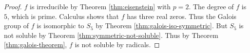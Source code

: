 \begin{proof}
    $f$ is irreducible by Theorem \ref{thm:eisenstein} with $p = 2$. The degree of $f$ is $5$, which is prime. Calculus shows that $f$ has three real zeros. Thus the Galois group of $f$ is isomorphic to $S_5$ by Theorem \ref{thm:galois-iso-symmetric}. But $S_5$ is not soluble by Theorem \ref{thm:symmetric-not-soluble}. Thus by Theorem \ref{thm:galois-theorem}, $f$ is not soluble by radicals.
\end{proof}
%
%
%
%
%
%
%
%
%
%
%
%
%	    
%	
%
%    
%
%
%
